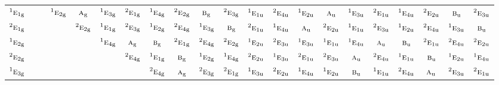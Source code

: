 \documentclass[10pt,a4paper]{article}
\numberwithin{equation}{section}
\newcommand{\irr}[1]{\text{\normalfont\scshape #1}}
\newcommand{\conjpair}[1]{{}^{#1}}
\newcommand{\ptag}[1]{\mathrm{#1}}
\begin{document}
{\begin{longtable}{@{}lcccccccccccccccccccc@{}}
$\conjpair{1}\irr{e}_{1\ptag{g}}$ &  &  & $\conjpair{1}\irr{e}_{2\ptag{g}}$ & $\irr{a}_{\ptag{g}}$ & $\conjpair{1}\irr{e}_{3\ptag{g}}$ & $\conjpair{2}\irr{e}_{1\ptag{g}}$ & $\conjpair{1}\irr{e}_{4\ptag{g}}$ & $\conjpair{2}\irr{e}_{2\ptag{g}}$ & $\irr{b}_{\ptag{g}}$ & $\conjpair{2}\irr{e}_{3\ptag{g}}$ & $\conjpair{1}\irr{e}_{1\ptag{u}}$ & $\conjpair{2}\irr{e}_{4\ptag{u}}$ & $\conjpair{1}\irr{e}_{2\ptag{u}}$ & $\irr{a}_{\ptag{u}}$ & $\conjpair{1}\irr{e}_{3\ptag{u}}$ & $\conjpair{2}\irr{e}_{1\ptag{u}}$ & $\conjpair{1}\irr{e}_{4\ptag{u}}$ & $\conjpair{2}\irr{e}_{2\ptag{u}}$ & $\irr{b}_{\ptag{u}}$ & $\conjpair{2}\irr{e}_{3\ptag{u}}$\\
$\conjpair{2}\irr{e}_{1\ptag{g}}$ &  &  &  & $\conjpair{2}\irr{e}_{2\ptag{g}}$ & $\conjpair{1}\irr{e}_{1\ptag{g}}$ & $\conjpair{2}\irr{e}_{3\ptag{g}}$ & $\conjpair{1}\irr{e}_{2\ptag{g}}$ & $\conjpair{2}\irr{e}_{4\ptag{g}}$ & $\conjpair{1}\irr{e}_{3\ptag{g}}$ & $\irr{b}_{\ptag{g}}$ & $\conjpair{2}\irr{e}_{1\ptag{u}}$ & $\conjpair{1}\irr{e}_{4\ptag{u}}$ & $\irr{a}_{\ptag{u}}$ & $\conjpair{2}\irr{e}_{2\ptag{u}}$ & $\conjpair{1}\irr{e}_{1\ptag{u}}$ & $\conjpair{2}\irr{e}_{3\ptag{u}}$ & $\conjpair{1}\irr{e}_{2\ptag{u}}$ & $\conjpair{2}\irr{e}_{4\ptag{u}}$ & $\conjpair{1}\irr{e}_{3\ptag{u}}$ & $\irr{b}_{\ptag{u}}$\\
$\conjpair{1}\irr{e}_{2\ptag{g}}$ &  &  &  &  & $\conjpair{1}\irr{e}_{4\ptag{g}}$ & $\irr{a}_{\ptag{g}}$ & $\irr{b}_{\ptag{g}}$ & $\conjpair{2}\irr{e}_{1\ptag{g}}$ & $\conjpair{2}\irr{e}_{4\ptag{g}}$ & $\conjpair{2}\irr{e}_{2\ptag{g}}$ & $\conjpair{1}\irr{e}_{2\ptag{u}}$ & $\conjpair{2}\irr{e}_{3\ptag{u}}$ & $\conjpair{1}\irr{e}_{3\ptag{u}}$ & $\conjpair{1}\irr{e}_{1\ptag{u}}$ & $\conjpair{1}\irr{e}_{4\ptag{u}}$ & $\irr{a}_{\ptag{u}}$ & $\irr{b}_{\ptag{u}}$ & $\conjpair{2}\irr{e}_{1\ptag{u}}$ & $\conjpair{2}\irr{e}_{4\ptag{u}}$ & $\conjpair{2}\irr{e}_{2\ptag{u}}$\\
$\conjpair{2}\irr{e}_{2\ptag{g}}$ &  &  &  &  &  & $\conjpair{2}\irr{e}_{4\ptag{g}}$ & $\conjpair{1}\irr{e}_{1\ptag{g}}$ & $\irr{b}_{\ptag{g}}$ & $\conjpair{1}\irr{e}_{2\ptag{g}}$ & $\conjpair{1}\irr{e}_{4\ptag{g}}$ & $\conjpair{2}\irr{e}_{2\ptag{u}}$ & $\conjpair{1}\irr{e}_{3\ptag{u}}$ & $\conjpair{2}\irr{e}_{1\ptag{u}}$ & $\conjpair{2}\irr{e}_{3\ptag{u}}$ & $\irr{a}_{\ptag{u}}$ & $\conjpair{2}\irr{e}_{4\ptag{u}}$ & $\conjpair{1}\irr{e}_{1\ptag{u}}$ & $\irr{b}_{\ptag{u}}$ & $\conjpair{1}\irr{e}_{2\ptag{u}}$ & $\conjpair{1}\irr{e}_{4\ptag{u}}$\\
$\conjpair{1}\irr{e}_{3\ptag{g}}$ &  &  &  &  &  &  & $\conjpair{2}\irr{e}_{4\ptag{g}}$ & $\irr{a}_{\ptag{g}}$ & $\conjpair{2}\irr{e}_{3\ptag{g}}$ & $\conjpair{2}\irr{e}_{1\ptag{g}}$ & $\conjpair{1}\irr{e}_{3\ptag{u}}$ & $\conjpair{2}\irr{e}_{2\ptag{u}}$ & $\conjpair{1}\irr{e}_{4\ptag{u}}$ & $\conjpair{1}\irr{e}_{2\ptag{u}}$ & $\irr{b}_{\ptag{u}}$ & $\conjpair{1}\irr{e}_{1\ptag{u}}$ & $\conjpair{2}\irr{e}_{4\ptag{u}}$ & $\irr{a}_{\ptag{u}}$ & $\conjpair{2}\irr{e}_{3\ptag{u}}$ & $\conjpair{2}\irr{e}_{1\ptag{u}}$\\

\end{longtable}}
\end{document}
